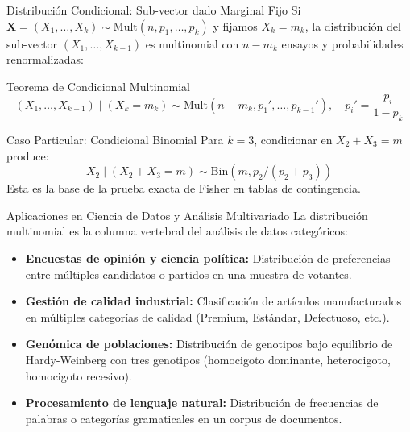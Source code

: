 \documentclass[10pt, aspectratio=169]{beamer}
\begin{document}
\begin{frame}{Distribución Condicional: Sub-vector dado Marginal Fijo}
  \footnotesize
  Si $\bm{X} = (X_{1}, \dots, X_{k}) \sim \text{Mult}(n, p_{1}, \dots, p_{k})$ y fijamos $X_{k} = m_{k}$, la distribución del sub-vector $(X_{1}, \dots, X_{k-1})$ es multinomial con $n - m_{k}$ ensayos y probabilidades renormalizadas: \pause

  \vspace{0.1cm}
  \begin{block}{Teorema de Condicional Multinomial}
    $$(X_{1}, \dots, X_{k-1}) \mid (X_{k} = m_{k}) \sim \text{Mult}(n - m_{k}, p_{1}', \dots, p_{k-1}'), \quad p_{i}' = \dfrac{p_{i}}{1 - p_{k}}$$
  \end{block}

  \vspace{0.1cm}
  \pause
  \begin{alertblock}{Caso Particular: Condicional Binomial}
    Para $k = 3$, condicionar en $X_{2} + X_{3} = m$ produce:
    $$X_{2} \mid (X_{2} + X_{3} = m) \sim \text{Bin}(m, p_{2}/(p_{2} + p_{3}))$$
    Esta es la base de la prueba exacta de Fisher en tablas de contingencia.
  \end{alertblock}
\end{frame}

\begin{frame}{Aplicaciones en Ciencia de Datos y Análisis Multivariado}
  \footnotesize
  La distribución multinomial es la columna vertebral del análisis de datos categóricos: \pause

  \vspace{0.15cm}
  \begin{itemize}\itemsep=0.15cm
    \item \textbf{Encuestas de opinión y ciencia política:} Distribución de preferencias entre múltiples candidatos o partidos en una muestra de votantes. \pause
    \item \textbf{Gestión de calidad industrial:} Clasificación de artículos manufacturados en múltiples categorías de calidad (Premium, Estándar, Defectuoso, etc.). \pause
    \item \textbf{Genómica de poblaciones:} Distribución de genotipos bajo equilibrio de Hardy-Weinberg con tres genotipos (homocigoto dominante, heterocigoto, homocigoto recesivo). \pause
    \item \textbf{Procesamiento de lenguaje natural:} Distribución de frecuencias de palabras o categorías gramaticales en un corpus de documentos.
  \end{itemize}
\end{frame}
\end{document}
